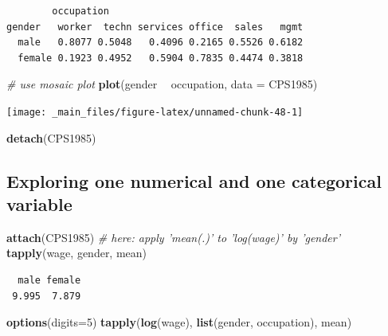 \documentclass[
]{book}
\newenvironment{Shaded}{\begin{snugshade}}{\end{snugshade}}
\newcommand{\CommentTok}[1]{\textcolor[rgb]{0.56,0.35,0.01}{\textit{#1}}}
\newcommand{\DataTypeTok}[1]{\textcolor[rgb]{0.13,0.29,0.53}{#1}}
\newcommand{\DecValTok}[1]{\textcolor[rgb]{0.00,0.00,0.81}{#1}}
\newcommand{\KeywordTok}[1]{\textcolor[rgb]{0.13,0.29,0.53}{\textbf{#1}}}
\newcommand{\NormalTok}[1]{#1}
\newcommand{\OperatorTok}[1]{\textcolor[rgb]{0.81,0.36,0.00}{\textbf{#1}}}
\newcommand{\StringTok}[1]{\textcolor[rgb]{0.31,0.60,0.02}{#1}}
\begin{document}
\begin{verbatim}
        occupation
gender   worker  techn services office  sales   mgmt
  male   0.8077 0.5048   0.4096 0.2165 0.5526 0.6182
  female 0.1923 0.4952   0.5904 0.7835 0.4474 0.3818
\end{verbatim}

\begin{Shaded}
\begin{Highlighting}[]
\CommentTok{# use mosaic plot }
\KeywordTok{plot}\NormalTok{(gender }\OperatorTok{~}\StringTok{ }\NormalTok{occupation, }\DataTypeTok{data =}\NormalTok{ CPS1985)}
\end{Highlighting}
\end{Shaded}

\begin{center}\texttt{[image: \_main\_files/figure-latex/unnamed-chunk-48-1]} \end{center}

\begin{Shaded}
\begin{Highlighting}[]
\KeywordTok{detach}\NormalTok{(CPS1985)}
\end{Highlighting}
\end{Shaded}

\hypertarget{exploring-one-numerical-and-one-categorical-variable}{%
\subsection{Exploring one numerical and one categorical variable}\label{exploring-one-numerical-and-one-categorical-variable}}

\begin{Shaded}
\begin{Highlighting}[]
\KeywordTok{attach}\NormalTok{(CPS1985)}
\CommentTok{# here: apply 'mean(.)' to 'log(wage)' by 'gender'}
\KeywordTok{tapply}\NormalTok{(wage, gender, mean)}
\end{Highlighting}
\end{Shaded}

\begin{verbatim}
  male female 
 9.995  7.879 
\end{verbatim}

\begin{Shaded}
\begin{Highlighting}[]
\KeywordTok{options}\NormalTok{(}\DataTypeTok{digits=}\DecValTok{5}\NormalTok{)}
\KeywordTok{tapply}\NormalTok{(}\KeywordTok{log}\NormalTok{(wage), }\KeywordTok{list}\NormalTok{(gender, occupation), mean)}
\end{Highlighting}
\end{Shaded}
\end{document}
